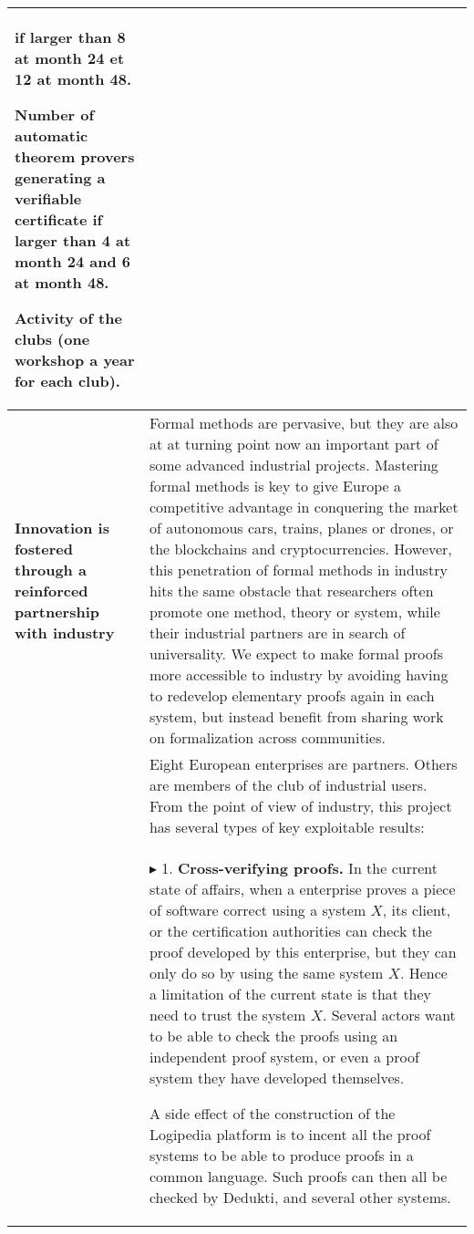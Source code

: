 \begin{longtable}{|p{}|p{}|}
\begin{compactitem}
if larger than 8 at month 24 et 12 at month 48.
\item Number of automatic theorem provers generating a verifiable certificate
if larger than 4 at month 24 and 6 at month 48. 
\item Activity of the clubs (one workshop a year for each club).
\end{compactitem}
\\
\hline
{\bf Innovation is fostered through a reinforced partnership
with industry}
&
Formal methods are pervasive, but they are also 
at at turning point
now an important part of some advanced industrial
projects. Mastering formal methods is key to give Europe a competitive
advantage in conquering the market of autonomous cars, trains, planes
or drones, or the blockchains and cryptocurrencies. However, this
penetration of formal methods in industry hits the same obstacle that
researchers often promote one method, theory or system, while their
industrial partners are in search of universality. We expect to make
formal proofs more accessible to industry by avoiding having to redevelop
elementary proofs again in each system, but instead benefit from
sharing work on formalization across communities.\\
&
\hspace{0.4cm}
Eight European enterprises are partners.
Others are members of the club of
industrial users.  From the point of view of industry, this
project has several types of key exploitable results:\\
&
$\blacktriangleright$
1. {\bf Cross-verifying proofs.}
In the current state of affairs, when a enterprise proves a piece of
software correct using a system $X$, its client, or the certification
authorities can check the proof developed by this enterprise, but they
can only do so by using the same system $X$. Hence a limitation of
the current state is that they need to trust the system $X$.
Several actors want to be able to check the proofs using an
independent proof system, or even a proof system they have developed
themselves.

A side effect of the construction of the Logipedia platform is
to incent all the proof systems to be able to produce proofs in a
common language. Such proofs can then all be checked by
Dedukti, and several other systems.


\end{longtable}
